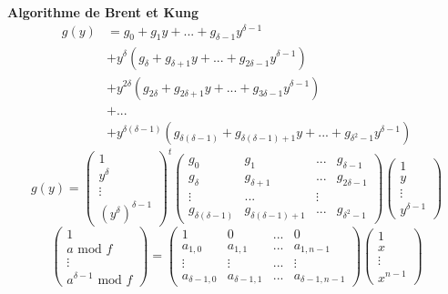 \documentclass[10pt,a4paper]{beamer}
\begin{document}
\begin{frame}
    \textbf{Algorithme de Brent et Kung} 
    \begin{align*}
        g(y) &= g_0 + g_1y + ... + g_{\delta-1}y^{\delta-1} \\
            &+ y^\delta(g_\delta + g_{\delta+1}y + ... + g_{2\delta-1}y^{\delta-1}) \\
                                          &+ y^{2\delta}(g_{2\delta} + g_{2\delta+1}y + ... + g_{3\delta-1}y^{\delta-1}) \\
                                          &+ ... \\
                                          &+ y^{\delta(\delta-1)}(g_{\delta(\delta-1)} + g_{\delta(\delta-1)+1}y + ... + g_{\delta^2-1}y^{\delta-1}) 
    \end{align*}
    \pause
    \[
    g(y) = 
    \begin{pmatrix}
        1 \\
        y^\delta \\
        \vdots \\
        (y^\delta)^{\delta-1} 
    \end{pmatrix}^t
    \begin{pmatrix}
        g_0 & g_1 & ... & g_{\delta-1} \\
        g_{\delta} & g_{\delta+1} & ... & g_{2\delta-1} \\
        \vdots & ... & \vdots \\
        g_{\delta(\delta-1)} & g_{\delta(\delta-1)+1} & ... & g_{\delta^2-1}
    \end{pmatrix}
    \begin{pmatrix}
        1 \\
        y \\
        \vdots \\
        y^{\delta-1}
    \end{pmatrix}
    \]
    \[
        \begin{pmatrix}
            1 \\
            a \text{ mod }f\\
            \vdots \\
            a^{\delta-1} \text{ mod }f
        \end{pmatrix}
        =
        \begin{pmatrix}
            1 & 0 & ... & 0 \\
            a_{1,0} & a_{1,1} & ... & a_{1,n-1} \\
            \vdots & \vdots & ... & \vdots \\
            a_{\delta-1,0} & a_{\delta-1,1} & ... & a_{\delta-1,n-1}
        \end{pmatrix}
        \begin{pmatrix}
            1 \\
            x \\
            \vdots \\
            x^{n-1}
        \end{pmatrix}
    \]
\end{frame}
\end{document}

